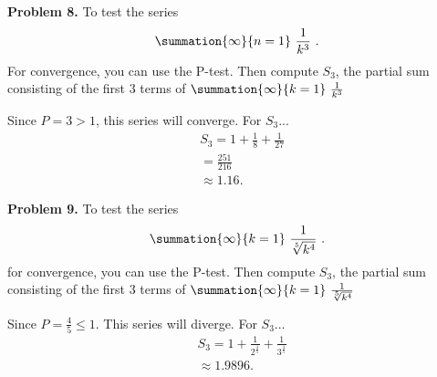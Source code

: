 \documentclass{report}
\begin{document}
  \bigbreak \noindent 
   \begin{mdframed}
       \textbf{Problem 8.} To test the series 
       \begin{align*}
           \summation{\infty}{n=1}\ \frac{1}{k^{3}}\ 
       .\end{align*}
       For convergence, you can use the P-test. Then compute $S_{3}$, the partial sum consisting of the first 3 terms of $\summation{\infty}{k=1}\ \frac{1}{k^{3}}\  $
   \end{mdframed}
   \bigbreak \noindent 
   Since $P = 3 > 1$, this series will converge. For $S_{3}$...
   \begin{align*}
       &S_{3} = 1+ \frac{1}{8} + \frac{1}{27} \\
       &=\frac{251}{216} \\
       &\approx 1.16
   .\end{align*}

   \pagebreak \bigbreak \noindent 
   \begin{mdframed}
       \textbf{Problem 9.} To test the series 
       \begin{align*}
           \summation{\infty}{k=1}\ \frac{1}{\sqrt[5]{k^{4}}}\ 
       .\end{align*}
       for convergence, you can use the P-test. Then compute $S_{3}$, the partial sum consisting of the first 3 terms of $\summation{\infty}{k=1}\ \frac{1}{\sqrt[5]{k^{4}}}\  $
   \end{mdframed}
   \bigbreak \noindent 
   Since $P = \frac{4}{5} \leq 1$. This series will diverge. For $S_{3}$...
   \begin{align*}
       &S_{3} = 1 + \frac{1}{2^{\frac{4}{5}}} + \frac{1}{3^{\frac{4}{5}}} \\
       &\approx 1.9896
   .\end{align*}

    
\end{document}

